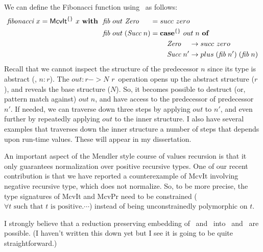 We can define the Fibonacci function using \McvIt\ as follows:
\begin{align*}
\textit{fibonacci}~x = \textsf{McvIt}^{\{\}}~x~\textbf{with}~~
&  \textit{fib} ~out ~\textit{Zero}~~~~\; = succ~zero \\
&  \textit{fib} ~out \;(\textit{Succ}\;n) =
            \textbf{case}^{\{\}}~out\;n~\textbf{of} \\
&\qquad\qquad\qquad\qquad\quad
              \textit{Zero}~~~\, -> succ~zero \\
&\qquad\qquad\qquad\qquad\quad
              \textit{Succ}\;n'  -> plus\;(\textit{fib}\;n')\;(\textit{fib}\;n)
\end{align*}
Recall that we cannot inspect the structure of the predecessor $n$ since
its type is abstract (\ie, $n:r$). The $out : r -> \textit{N r}\,$ operation
opens up the abstract structure ($r$), and reveals the base structure ($N$).
So, it becomes possible to destruct (or, pattern match against) $out\;n$,
and have access to the predecessor of predecessor $n'$. If needed, we can
traverse down three steps by applying $out$ to $n'$, and even further by
repeatedly applying $out$ to the inner structure. I also have several examples
that traverses down the inner structure a number of steps that depends
upon run-time values. These will appear in my dissertation.

An important aspect of the Mendler style course of values recursion is that
it only guarantees normalization over positive recursive types. One of our
recent contribution is that we have reported a counterexample of \textsf{McvIt}
involving negative recursive type, which does not normalize. So, to be more
precise, the type signatures of \textsf{McvIt} and \textsf{McvPr} need to
be constrained ($\forall t \text{~such that~$t$ is positive}.\cdots$)
instead of being unconstrainedly polymorphic on $t$.

I strongly believe that a reduction preserving embedding of
\McvIt\ and \McvPr\ into \Fixw\, and \Fixi\ are possible.
(I haven't written this down yet but I see it is going to be
quite straightforward.)

